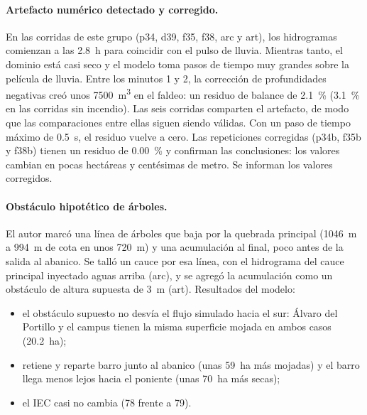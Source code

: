 \paragraph{Artefacto numérico detectado y corregido.} En las corridas de este grupo (p34, d39, f35, f38, arc y art), los hidrogramas comienzan a las \SI{2,8}{h} para coincidir con el pulso de lluvia. Mientras tanto, el dominio está casi seco y el modelo toma pasos de tiempo muy grandes sobre la película de lluvia. Entre los minutos 1 y 2, la corrección de profundidades negativas creó unos \SI{7500}{m^3} en el faldeo: un residuo de balance de \SI[retain-explicit-plus=true]{+2,1}{\percent} (\SI[retain-explicit-plus=true]{+3,1}{\percent} en las corridas sin incendio). Las seis corridas comparten el artefacto, de modo que las comparaciones entre ellas siguen siendo válidas. Con un paso de tiempo máximo de \SI{0,5}{s}, el residuo vuelve a cero. Las repeticiones corregidas (p34b, f35b y f38b) tienen un residuo de \SI{0,00}{\percent} y confirman las conclusiones: los valores cambian en pocas hectáreas y centésimas de metro. Se informan los valores corregidos.

\paragraph{Obstáculo hipotético de árboles.} El autor marcó una línea de árboles que baja por la quebrada principal (\SI{1046}{m} a \SI{994}{m} de cota en unos \SI{720}{m}) y una acumulación al final, poco antes de la salida al abanico. Se talló un cauce por esa línea, con el hidrograma del cauce principal inyectado aguas arriba (arc), y se agregó la acumulación como un obstáculo de altura supuesta de \SI{3}{m} (art). Resultados del modelo:
\begin{itemize}
\item el obstáculo supuesto no desvía el flujo simulado hacia el sur: Álvaro del Portillo y el campus tienen la misma superficie mojada en ambos casos (\SI{20,2}{ha});
\item retiene y reparte barro junto al abanico (unas \SI{59}{ha} más mojadas) y el barro llega menos lejos hacia el poniente (unas \SI{70}{ha} más secas);
\item el IEC casi no cambia (78 frente a 79).
\end{itemize}

